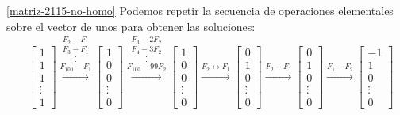 \begin{enumerate}[topsep=6pt, itemsep=.4cm]
\ref{matriz-2115-no-homo} Podemos repetir la secuencia de operaciones elementales sobre el vector de unos para obtener las soluciones:
\begin{align*}
&\left[\begin{array}{c} 1\\ 1 \\ 1 \\ \vdots \\1 \end{array}\right]
\stackrel{F_2-F_1}{\stackrel{F_3 - F_1}{\stackrel{\vdots}{\stackrel{F_{100}-F_1}{\longrightarrow}}}}
\left[\begin{array}{c} 1\\ 0 \\ 0 \\ \vdots \\0 \end{array}\right]
\stackrel{F_3-2F_2}{\stackrel{F_4-3F_2}{\stackrel{\vdots}{\stackrel{F_{100}-99F_2}{\longrightarrow}}}}
\left[\begin{array}{c} 1\\ 0 \\ 0 \\ \vdots \\0 \end{array}\right]
\stackrel{F_2 \leftrightarrow F_1}{\longrightarrow}
\left[\begin{array}{c} 0\\ 1 \\ 0 \\ \vdots \\0 \end{array}\right]
\stackrel{F_2-F_1}{\longrightarrow}
\left[\begin{array}{c} 0\\ 1 \\ 0 \\ \vdots \\0 \end{array}\right]
\stackrel{F_1-F_2}{\longrightarrow} 
\left[\begin{array}{c} -1\\ 1 \\ 0 \\ \vdots \\0 \end{array}\right]
\end{align*}


\end{enumerate}

